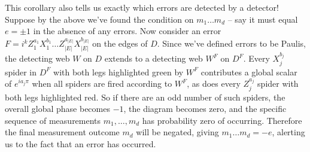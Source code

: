 This corollary also tells us exactly which errors are detected by a detector!
Suppose by the above we've found the condition on $m_1 \ldots m_d$ -- say it must equal $e = \pm 1$ in the absence of any errors.
Now consider an error $F = i^k Z_1^{a_1}X_1^{b_1} \ldots Z_{|E|}^{a_{|E|}}X_{|E|}^{b_{|E|}}$ on the edges of $D$.
Since we've defined errors to be Paulis, the detecting web $W$ on $D$ extends to a detecting web $W^F$ on $D^F$.
Every $X_j^{b_j}$ spider in $D^F$ with both legs highlighted green by $W^F$ contributes a global scalar of $e^{ia_j\pi}$ when all spiders are fired according to $W^F$, as does every $Z_j^{a_j}$ spider with both legs highlighted red.
So if there are an odd number of such spiders, the overall global phase becomes $-1$, the diagram becomes zero, and the specific sequence of measurements $m_1, \ldots, m_d$ has probability zero of occurring.
Therefore the final measurement outcome $m_d$ will be negated, giving $m_1 \ldots m_d = -e$, alerting us to the fact that an error has occurred.

